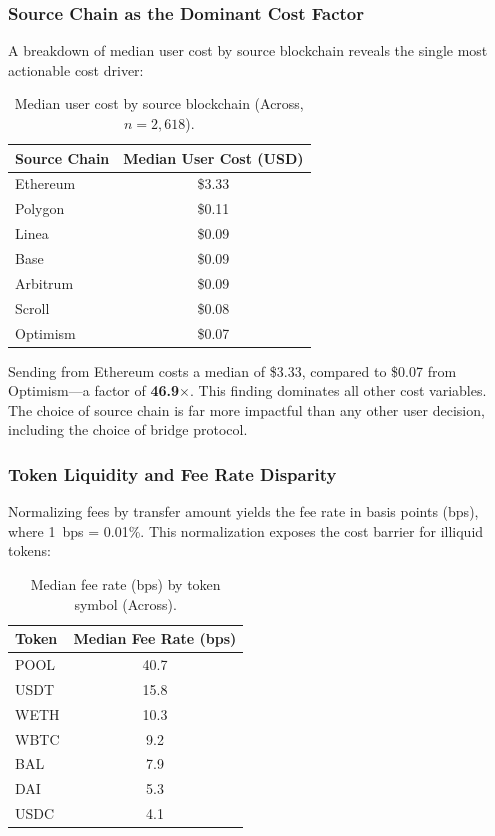 \subsubsection{Source Chain as the Dominant Cost Factor}

A breakdown of median user cost by source blockchain reveals the single most actionable cost driver:

\begin{table}[h]
\centering
\caption{Median user cost by source blockchain (Across, $n = 2{,}618$).}
\label{tab:chain_cost}
\begin{tabular}{lc}
\toprule
\textbf{Source Chain} & \textbf{Median User Cost (USD)} \\
\midrule
Ethereum  & \$3.33 \\
Polygon   & \$0.11 \\
Linea     & \$0.09 \\
Base      & \$0.09 \\
Arbitrum  & \$0.09 \\
Scroll    & \$0.08 \\
Optimism  & \$0.07 \\
\bottomrule
\end{tabular}
\end{table}

Sending from Ethereum costs a median of \$3.33, compared to \$0.07 from Optimism---a factor of \textbf{46.9$\times$}. This finding dominates all other cost variables. The choice of source chain is far more impactful than any other user decision, including the choice of bridge protocol.

\subsubsection{Token Liquidity and Fee Rate Disparity}

Normalizing fees by transfer amount yields the fee rate in basis points (bps), where 1~bps = 0.01\%. This normalization exposes the cost barrier for illiquid tokens:

\begin{table}[h]
\centering
\caption{Median fee rate (bps) by token symbol (Across).}
\label{tab:token_fee_rate}
\begin{tabular}{lc}
\toprule
\textbf{Token} & \textbf{Median Fee Rate (bps)} \\
\midrule
POOL  & 40.7 \\
USDT  & 15.8 \\
WETH  & 10.3 \\
WBTC  &  9.2 \\
BAL   &  7.9 \\
DAI   &  5.3 \\
USDC  &  4.1 \\
\bottomrule
\end{tabular}
\end{table}

